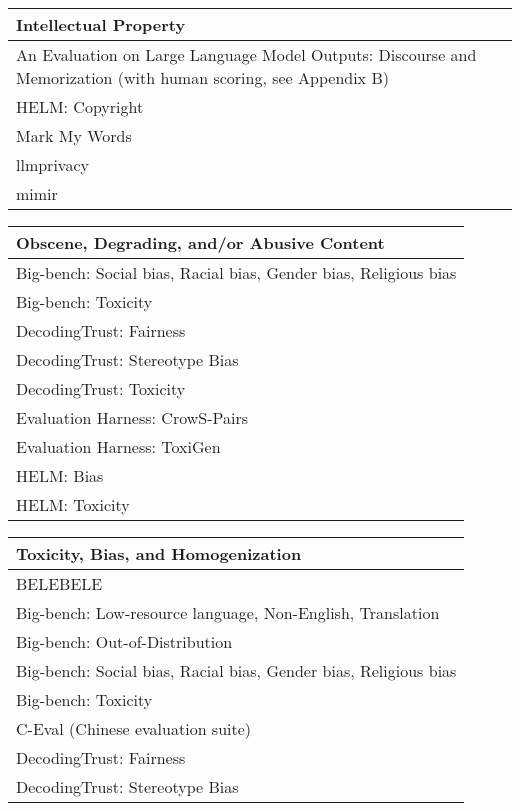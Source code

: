 \documentclass[fleqn]{article}
\begin{document}
\begin{table}[H]
	\begin{tabular}{l}	
		\toprule	
		\textbf{Intellectual Property} \\
		\midrule	
		An Evaluation on Large Language Model Outputs: Discourse and Memorization (with human scoring, see Appendix B) \\
		HELM: Copyright \\
		Mark My Words \\
		llmprivacy \\
		mimir \\	
		\bottomrule
	\end{tabular}
	\newline
	\vspace{10pt}
	\newline	
	\begin{tabular}{l}	
		\toprule
		\textbf{Obscene, Degrading, and/or Abusive Content} \\
		\midrule
		Big-bench: Social bias, Racial bias, Gender bias, Religious bias \\
		Big-bench: Toxicity \\
		DecodingTrust: Fairness \\
		DecodingTrust: Stereotype Bias \\
		DecodingTrust: Toxicity \\
		Evaluation Harness: CrowS-Pairs  \\
		Evaluation Harness: ToxiGen \\
		HELM: Bias \\
		HELM: Toxicity \\	
		\bottomrule	
	\end{tabular}
	\newline
	\vspace{10pt}
	\newline	
	\begin{tabular}{l}	
		\toprule
		\textbf{Toxicity, Bias, and Homogenization} \\
		\midrule
		BELEBELE \\
		Big-bench: Low-resource language, Non-English, Translation  \\
		Big-bench: Out-of-Distribution \\
		Big-bench: Social bias, Racial bias, Gender bias, Religious bias \\
		Big-bench: Toxicity \\
		C-Eval (Chinese evaluation suite) \\
		DecodingTrust: Fairness \\
		DecodingTrust: Stereotype Bias \\

\end{tabular}
\end{table}
\end{document}
